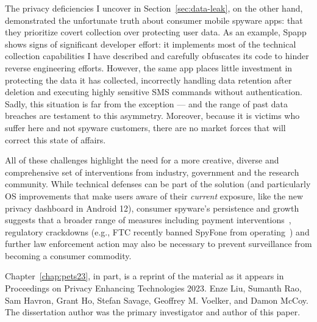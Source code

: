 The privacy deficiencies I uncover in Section~\ref{sec:data-leak}, on
the other hand, demonstrated the unfortunate truth about consumer
mobile spyware apps: that they prioritize covert collection over
protecting user data.  As an example, Spapp shows signs of
significant developer effort: it implements most of the technical
collection capabilities I have described and carefully obfuscates its
code to hinder reverse engineering efforts. However, the same app
places little investment in protecting the data it has collected,
incorrectly handling data retention after deletion and executing
highly sensitive SMS commands without authentication.  Sadly, this
situation is far from the exception --- and the range of past data
breaches are testament to this asymmetry.  Moreover, because it is
victims who suffer here and not spyware customers, there are no market
forces that will correct this state of affairs.

All of these challenges highlight the need for a more creative,
diverse and comprehensive set of interventions from industry,
government and the research community.  While technical defenses can
be part of the solution (and particularly OS improvements that make
users aware of their \emph{current} exposure, like the new privacy
dashboard in Android 12), consumer spyware's persistence and growth
suggests that a broader range of measures including payment
interventions~\cite{mccoy2012priceless}, regulatory crackdowns (e.g., FTC
recently banned SpyFone from operating~\cite{FTCFinal26:online}) and
further law enforcement action may also be necessary to prevent
surveillance from becoming a consumer commodity.


Chapter~\ref{chap:pets23}, in part, is a reprint of the material as it appears in Proceedings on Privacy Enhancing Technologies 2023. Enze Liu, Sumanth Rao, Sam Havron, Grant Ho, Stefan Savage, Geoffrey M. Voelker, and
Damon McCoy. The dissertation author was the primary investigator and author of this paper.



